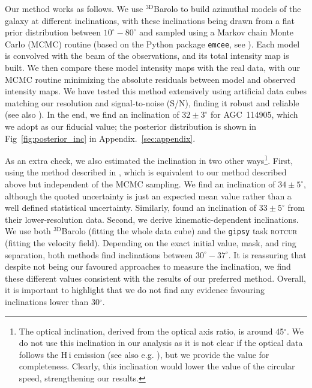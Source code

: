 \documentclass[fleqn,usenatbib]{mnras}
\begin{document}
Our method works as follows. We use $\mathrm{^{3D}}$Barolo to build azimuthal models of the galaxy at different inclinations, with these inclinations being drawn from a flat prior distribution between $10^\circ-80^\circ$ and sampled using a Markov chain Monte Carlo (MCMC) routine (based on the Python package \texttt{emcee}, see \citealt{emcee}). Each model is convolved with the beam of the observations, and its total intensity map is built. We then compare these model intensity maps with the real data, with our MCMC routine minimizing the absolute residuals between model and observed intensity maps. We have tested this method extensively using artificial data cubes matching our resolution and signal-to-noise (S/N), finding it robust and reliable (see also \citealt{filippo_highz}). In the end, we find an inclination of $32 \pm 3^\circ$ for AGC~114905, which we adopt as our fiducial value; the posterior distribution is shown in Fig~\ref{fig:posterior_inc}  in Appendix.~\ref{sec:appendix}.  

As an extra check, we also estimated the inclination in two other ways\footnote{The optical inclination, derived from the optical axis ratio, is around 45$^\circ$. We do not use this inclination in our analysis as it is not clear if the optical data follows the H\,{\sc i} emission (see also e.g. \citealt{lexi,kado-fong_LSBshapes}), but we provide the value for completeness. Clearly, this inclination would lower the value of the circular speed, strengthening our results.}. First, using the method described in \citet{huds2020}, which is equivalent to our method described above but independent of the MCMC sampling. We find an inclination of $34 \pm 5^\circ$, although the quoted uncertainty is just an expected mean value rather than a well defined statistical uncertainty. Similarly, \citet{huds2019,huds2020} found an inclination of $33 \pm 5^\circ$ from their lower-resolution data. Second, we derive kinematic-dependent inclinations. We use both $\mathrm{^{3D}}$Barolo (fitting the whole data cube) and the \texttt{gipsy} task \textsc{rotcur} (fitting the velocity field). Depending on the exact initial value, mask, and ring separation, both methods find inclinations between $30^\circ-37^\circ$. It is reassuring that despite not being our favoured approaches to measure the inclination, we find these different values consistent with the results of our preferred method. Overall, it is important to highlight that we do not find any evidence favouring inclinations lower than 30$^\circ$. %
\end{document}
